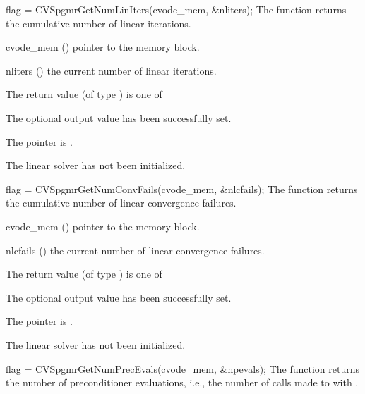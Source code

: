 {
  flag = CVSpgmrGetNumLinIters(cvode\_mem, \&nliters);
}
{
  The function  returns the
  cumulative number of linear iterations.
}
{
  \begin{args}
  \item[cvode\_mem] ()
    pointer to the {\cvodes} memory block.
  \item[nliters] ()
    the current number of linear iterations.
  \end{args}
}
{
  The return value  (of type ) is one of
  \begin{args}
  \item[\Id{CVSPGMR\_SUCCESS}] 
    The optional output value has been successfully set.
  \item[\Id{CVSPGMR\_MEM\_NULL}]
    The  pointer is .
  \item[\Id{CVSPGMR\_LMEM\_NULL}]
    The {\cvspgmr} linear solver has not been initialized.
  \end{args}
}
{}
{
  flag = CVSpgmrGetNumConvFails(cvode\_mem, \&nlcfails);
}
{
  The function  returns the
  cumulative number of linear convergence failures.
}
{
  \begin{args}
  \item[cvode\_mem] ()
    pointer to the {\cvodes} memory block.
  \item[nlcfails] ()
    the current number of linear convergence failures.
  \end{args}
}
{
  The return value  (of type ) is one of
  \begin{args}
  \item[\Id{CVSPGMR\_SUCCESS}] 
    The optional output value has been successfully set.
  \item[\Id{CVSPGMR\_MEM\_NULL}]
    The  pointer is .
  \item[\Id{CVSPGMR\_LMEM\_NULL}]
    The {\cvspgmr} linear solver has not been initialized.
  \end{args}
}
{}
{
  flag = CVSpgmrGetNumPrecEvals(cvode\_mem, \&npevals);
}
{
  The function  returns the
  number of preconditioner evaluations, i.e., the number of 
  calls made to  with .
}
